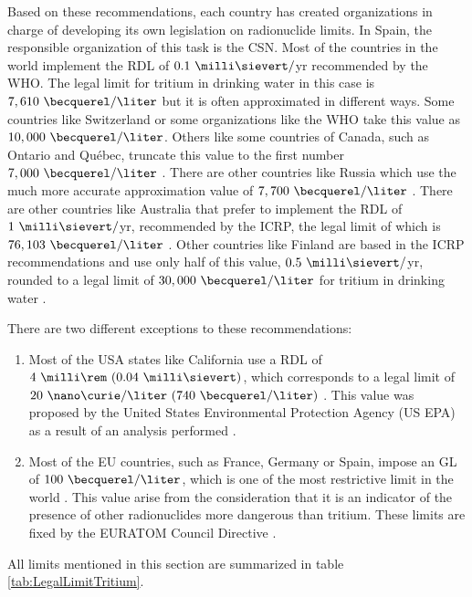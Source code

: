 Based on these recommendations, each country has created organizations in charge of developing its own legislation on radionuclide limits. In Spain, the responsible organization of this task is the CSN. Most of the countries in the world implement the RDL of $0.1~\milli\sievert/$yr recommended by the WHO. The legal limit for tritium in drinking water in this case is $7,610~\becquerel/\liter$  but it is often approximated in different ways. Some countries like Switzerland \cite{Switzerland_GL} or some organizations like the WHO \cite{WHO_GL} take this value as $10,000~\becquerel/\liter$. Others like some countries of Canada, such as Ontario and Québec, truncate this value to the first number $7,000~\becquerel/\liter$ \cite{Ontario_GL, Quebec_GL}. There are other countries like Russia which use the much more accurate approximation value of $7,700~\becquerel/\liter$ \cite{Russia_GL}. There are other countries like Australia that prefer to implement the RDL of $1~\milli\sievert/$yr, recommended by the ICRP, the legal limit of which is $76,103~\becquerel/\liter$ \cite{Australia_GL}. Other countries like Finland are based in the ICRP recommendations and use only half of this value, $0.5~\milli\sievert/$yr, rounded to a legal limit of $30,000~\becquerel/\liter$ for tritium in drinking water \cite{Finland_GL}.

There are two different exceptions to these recommendations:
\begin{enumerate}
\item{} Most of the USA states like California use a RDL of $4~\milli\rem~(0.04~\milli\sievert)$, which corresponds to a legal limit of $20~\nano\curie/\liter~(740~\becquerel/\liter)$ \cite{California_GL}. This value was proposed by the United States Environmental Protection Agency (US EPA) as a result of an analysis performed \cite{USEPA_GL}.

\item{} Most of the EU countries, such as France, Germany or Spain, impose an GL of $100~\becquerel/\liter$, which is one of the most restrictive limit in the world \cite{France_GL, Germany_GL, Spain_GL}. This value arise from the consideration that it is an indicator of the presence of other radionuclides more dangerous than tritium. These limits are fixed by the EURATOM Council Directive \cite{EURATOM_GL}. 
\end{enumerate}

All limits mentioned in this section are summarized in table \ref{tab:LegalLimitTritium}.

